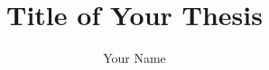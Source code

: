 \documentclass{hmcthesis}
\title{Title of Your Thesis}
\author{Your Name}
\begin{document}
\frontmatter
\maketitle


\tableofcontents
\listoffigures
\listoftables



\begin{acknowledgments}
\end{acknowledgments}


\mainmatter



























\appendix

%


\backmatter







\end{document}

